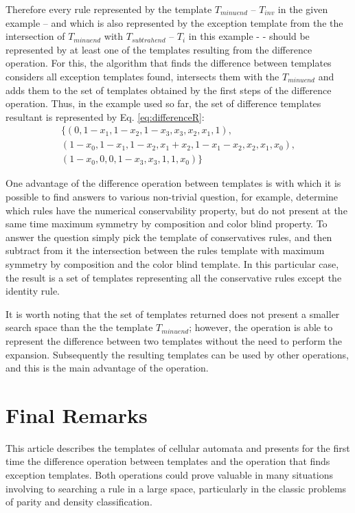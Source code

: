 \documentclass{llncs}
\begin{document}
Therefore every rule represented  by the template $T_{minuend}$ -- $T_{inv}$ in the given example -- and which is also represented by the exception template from the the intersection of $T_{minuend}$ with $T_{subtrahend}$ -- $T_i$ in this example - - should be represented by at least one of the templates resulting from the difference operation. For this, the algorithm that finds the difference between templates considers all exception templates found, intersects them with the $T_{minuend}$ and adds them to the set of templates obtained by the first steps of the difference operation. Thus, in the example used so far, the set of difference templates resultant is represented by Eq. \ref{eq:differenceR}:\begin{equation}
\begin{split}
\{(0, 1 - x_1, 1 - x_2, 1 - x_3, x_3, x_2, x_1, 1), \\
(1 - x_0, 1 - x_1, 1 - x_2, x_1 + x_2, 1 - x_1 - x_2, x_2, x_1, x_0), \\
(1 - x_0, 0, 0, 1 - x_3, x_3, 1, 1, x_0)\}
\label{eq:differenceR}
\end{split}
\end{equation}

One advantage of the difference operation between templates is with which it is possible to find answers to various non-trivial question, for example, determine which rules have the numerical conservability property, but do not present at the same time maximum symmetry by composition and color blind property. To answer the question simply pick the template of conservatives rules, and then subtract from it the intersection between the rules template with maximum symmetry by composition and the color blind template. In this particular case, the result is a set of templates representing all the conservative rules except the identity rule.

It is worth noting that the set of templates returned does not present a smaller search space than the the template $T_{minuend}$; however, the operation is able to represent the difference between two templates without the need to perform the expansion. Subsequently the resulting templates can be used by other operations, and this is the main advantage of the operation.









\section{Final Remarks}
\label{sec:consideracoes_finais}
This article describes the templates of cellular automata and presents for the first time the difference operation between templates and the operation that finds exception templates. Both operations could prove valuable in many situations involving to searching a rule in a large space, particularly in the classic problems of parity and density classification.
\end{document}
